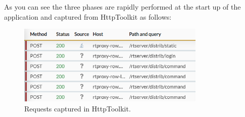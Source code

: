		As you can see the three phases are rapidly performed at the start up of the application and captured from HttpToolkit as follows:
		\begin{figure}[H]
				\centering
				\includegraphics[width=0.8\textwidth]{images/waze_phases.png}
				\caption{Requests captured in HttpToolkit.}
		\end{figure}
		
